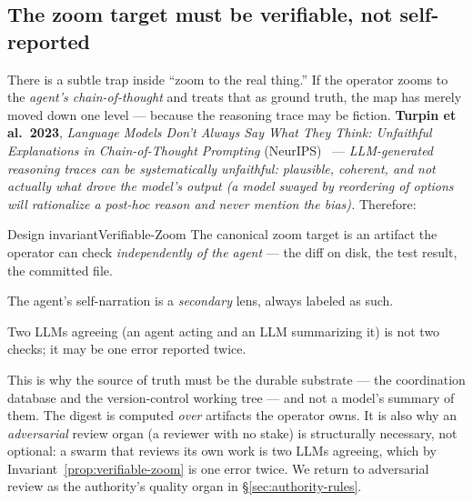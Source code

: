 \documentclass[11pt,a4paper]{article}
\theoremstyle{definition}
\theoremstyle{plain}
\begin{document}
\subsection{The zoom target must be verifiable, not self-reported}\label{sec:verifiable}

There is a subtle trap inside ``zoom to the real thing.'' If the operator zooms to
the \emph{agent's chain-of-thought} and treats that as ground truth, the map has
merely moved down one level --- because the reasoning trace may be fiction.
\textbf{Turpin et al.\ 2023}, \emph{Language Models Don't Always Say What They Think:
Unfaithful Explanations in Chain-of-Thought Prompting} (NeurIPS)~
--- \emph{LLM-generated reasoning traces can be systematically unfaithful: plausible,
coherent, and not actually what drove the model's output (a model swayed by
reordering of options will rationalize a post-hoc reason and never mention the
bias).} Therefore:


\begin{pdclaim}{Design invariant}{Verifiable-Zoom}
\setlength{\parskip}{4pt plus 1pt}
\label{prop:verifiable-zoom}
The canonical zoom target is an artifact the operator can check
\emph{independently of the agent} --- the diff on disk, the test result, the
committed file.

The agent's self-narration is a \emph{secondary} lens, always
labeled as such.

Two LLMs agreeing (an agent acting and an LLM summarizing it) is
not two checks; it may be one error reported twice.
\end{pdclaim}

This is why the source of truth must be the durable substrate --- the coordination
database and the version-control working tree --- and not a model's summary of them.
The digest is computed \emph{over} artifacts the operator owns. It is also why an \emph{adversarial} review organ (a
reviewer with no stake) is structurally necessary, not optional: a swarm that
reviews its own work is two LLMs agreeing, which by Invariant~\ref{prop:verifiable-zoom}
is one error twice. We return to adversarial review as the authority's quality organ
in \S\ref{sec:authority-rules}.

\end{document}
